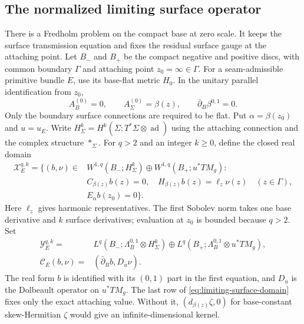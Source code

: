 \documentclass[11pt]{amsart}
\theoremstyle{definition}
\theoremstyle{remark}
\theoremstyle{plain}
\newcommand{\ad}{\operatorname{ad}}
\begin{document}
\subsection{The normalized limiting surface operator}
There is a Fredholm problem on the compact base at zero scale.
It keeps the surface transmission equation and fixes the residual
surface gauge at the attaching point. Let $B_-$ and $B_+$ be the
compact negative and positive discs, with common boundary $\Gamma$
and attaching point $z_0=\infty\in\Gamma$. For a seam-admissible
primitive bundle $E$, use its base-flat metric $H_0$. In the unitary
parallel identification from $z_0$,
\begin{equation}\label{eq:limiting-base-flat-frame}
 A_B^{(0)}=0,\qquad A_\Sigma^{(0)}=\beta(z),\qquad
 \bar\partial_B\beta^{0,1}=0.
\end{equation}
Only the boundary surface connections are required to be flat.
Put $\alpha=\beta(z_0)$ and $u=u_E$. Write
$H^k_\Sigma=H^k(\Sigma;T^*\Sigma\otimes\ad)$ using the attaching
connection and the complex structure $*_{\Sigma}$. For $q>2$ and
an integer $k\geq0$, define the closed real domain
\begin{equation}\label{eq:limiting-surface-domain}
 \begin{split}
 \mathcal X_E^{q,k}=\{(b,\nu)\in{}&
 W^{1,q}(B_-;H^k_\Sigma)\oplus W^{1,q}(B_+;u^*TM_g):\\
 &C_{\beta(z)}b(z)=0,\quad
 H_{\beta(z)}b(z)=\ell_z\nu(z)\quad(z\in\Gamma),\\
 &E_\alpha b(z_0)=0\}.
 \end{split}
\end{equation}
Here $\ell_z$ gives harmonic representatives. The first Sobolev
norm takes one base derivative and $k$ surface derivatives;
evaluation at $z_0$ is bounded because $q>2$. Set
\begin{equation}\label{eq:limiting-surface-operator}
 \begin{split}
 \mathcal Y_E^{q,k}={}&
 L^q(B_-;\Lambda_B^{0,1}\otimes H^k_\Sigma)
 \oplus L^q(B_+;\Lambda_B^{0,1}\otimes u^*TM_g),\\
 \mathcal C_E(b,\nu)={}&(\bar\partial_B b,D_u\nu).
 \end{split}
\end{equation}
The real form $b$ is identified with its $(0,1)$ part in the first
equation, and $D_u$ is the Dolbeault operator on $u^*TM_g$.
The last row of \eqref{eq:limiting-surface-domain} fixes only the
exact attaching value. Without it,
$(d_{\beta(z)}\zeta,0)$ for base-constant skew-Hermitian $\zeta$
would give an infinite-dimensional kernel.
\end{document}
